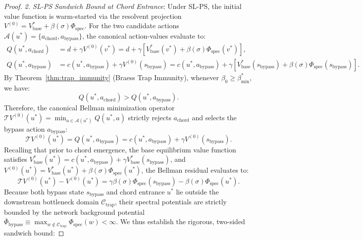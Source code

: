 \documentclass[11pt,a4paper]{article}
\begin{document}
\begin{proof}
\textit{2. SL-PS Sandwich Bound at Chord Entrance}:
Under SL-PS, the initial value function is warm-started via the resolvent projection $V^{(0)} = V_{\text{base}}^* + \beta(\sigma) \Phi_{\text{spec}}$. For the two candidate actions $\mathcal{A}(u^*) = \{ a_{\text{chord}}, a_{\text{bypass}} \}$, the canonical action-values evaluate to:
\begin{align}
Q(u^*, a_{\text{chord}}) &= d + \gamma V^{(0)}(v^*) = d + \gamma \left[ V_{\text{base}}^*(v^*) + \beta(\sigma) \Phi_{\text{spec}}(v^*) \right], \label{eq:q_chord_eval} \\
Q(u^*, a_{\text{bypass}}) &= c(u^*, a_{\text{bypass}}) + \gamma V^{(0)}(s_{\text{bypass}}) = c(u^*, a_{\text{bypass}}) + \gamma \left[ V_{\text{base}}^*(s_{\text{bypass}}) + \beta(\sigma) \Phi_{\text{spec}}(s_{\text{bypass}}) \right]. \label{eq:q_bypass_eval}
\end{align}
By Theorem~\ref{thm:trap_immunity} (Braess Trap Immunity), whenever $\beta_0 \ge \beta_{\min}^*$, we have:
\begin{equation}
Q(u^*, a_{\text{chord}}) > Q(u^*, a_{\text{bypass}}).
\end{equation}
Therefore, the canonical Bellman minimization operator $\mathcal{T} V^{(0)}(u^*) = \min_{a \in \mathcal{A}(u^*)} Q(u^*, a)$ strictly rejects $a_{\text{chord}}$ and selects the bypass action $a_{\text{bypass}}$:
\begin{equation}
\mathcal{T} V^{(0)}(u^*) = Q(u^*, a_{\text{bypass}}) = c(u^*, a_{\text{bypass}}) + \gamma V^{(0)}(s_{\text{bypass}}).
\end{equation}
Recalling that prior to chord emergence, the base equilibrium value function satisfies $V_{\text{base}}^*(u^*) = c(u^*, a_{\text{bypass}}) + \gamma V_{\text{base}}^*(s_{\text{bypass}})$, and $V^{(0)}(u^*) = V_{\text{base}}^*(u^*) + \beta(\sigma) \Phi_{\text{spec}}(u^*)$, the Bellman residual evaluates to:
\begin{equation}
\label{eq:tsl_minus_v_exact}
\mathcal{T} V^{(0)}(u^*) - V^{(0)}(u^*) = \gamma \beta(\sigma) \Phi_{\text{spec}}(s_{\text{bypass}}) - \beta(\sigma) \Phi_{\text{spec}}(u^*).
\end{equation}
Because both bypass state $s_{\text{bypass}}$ and chord entrance $u^*$ lie outside the downstream bottleneck domain $\mathcal{C}_{\text{trap}}$, their spectral potentials are strictly bounded by the network background potential $\bar{\Phi}_{\text{bypass}} \equiv \max_{w \notin \mathcal{C}_{\text{trap}}} \Phi_{\text{spec}}(w) < \infty$. We thus establish the rigorous, two-sided sandwich bound:

\end{proof}
\end{document}
